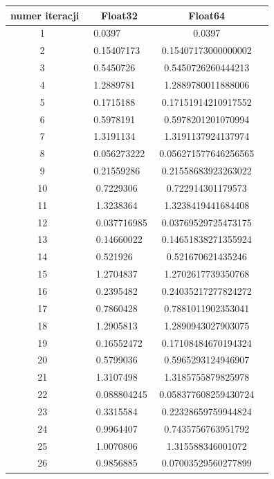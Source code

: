 \documentclass[]{article}
\begin{document}
		\begin{table}[!h]
		\centering
		\label{tab:table1}
		\begin{tabular}{|c|c|c|c|}
			\hline
			numer iteracji & Float32 & Float64 \\
			\hline
			1 & 0.0397      	    &  0.0397 \\ \hline
			2 & 0.15407173  		& 0.15407173000000002 \\ \hline
			3 & 0.5450726   		& 0.5450726260444213 \\ \hline
			4 & 1.2889781   		& 1.2889780011888006 \\ \hline
			5 & 0.1715188   		& 0.17151914210917552 \\ \hline
			6 & 0.5978191   		& 0.5978201201070994 \\ \hline
			7 & 1.3191134   		& 1.3191137924137974 \\ \hline
			8 & 0.056273222 		& 0.056271577646256565 \\ \hline
			9 & 0.21559286  		& 0.21558683923263022 \\ \hline
			10 & 0.7229306  		& 0.722914301179573 \\ \hline
			11 & 1.3238364  		& 1.3238419441684408 \\ \hline
			12 & 0.037716985		& 0.03769529725473175 \\ \hline
			13 & 0.14660022 		& 0.14651838271355924 \\ \hline
			14 & 0.521926   		& 0.521670621435246 \\ \hline
			15 & 1.2704837  		& 1.2702617739350768 \\ \hline
			16 & 0.2395482  		& 0.24035217277824272 \\ \hline
			17 & 0.7860428  		& 0.7881011902353041 \\ \hline
			18 & 1.2905813  		& 1.2890943027903075 \\ \hline
			19 & 0.16552472 		& 0.17108484670194324 \\ \hline
			20 & 0.5799036  		& 0.5965293124946907 \\ \hline
			21 & 1.3107498  		& 1.3185755879825978 \\ \hline
			22 & 0.088804245		& 0.058377608259430724 \\ \hline
			23 & 0.3315584  		& 0.22328659759944824 \\ \hline
			24 & 0.9964407  		& 0.7435756763951792 \\ \hline
			25 & 1.0070806  		& 1.315588346001072 \\ \hline
			26 & 0.9856885  		& 0.07003529560277899 \\ \hline

\end{tabular}
\end{table}
\end{document}
